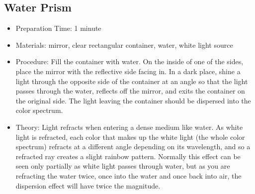 \subsection{Water Prism}
\begin{itemize}
\item{Preparation Time: 1 minute}
\item{Materials: mirror, clear rectangular container, water, white light source}
\item{Procedure: Fill the container with water. On the inside of one of the sides, place the mirror with the reflective side facing in. In a dark place, shine a light through the opposite side of the container at an angle so that the light passes through the water, reflects off the mirror, and exits the container on the original side. The light leaving the container should be dispersed into the color spectrum.}
\item{Theory: Light refracts when entering a dense medium like water. As white light is refracted, each color that makes up the white light (the whole color spectrum) refracts at a different angle depending on its wavelength, and so a refracted ray creates a slight rainbow pattern. Normally this effect can be seen only partially as white light passes through water, but as you are refracting the water twice, once into the water and once back into air, the dispersion effect will have twice the magnitude.}
\end{itemize}


